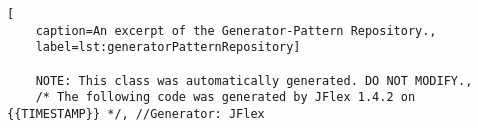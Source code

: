 
\begin{lstlisting}[
	caption=An excerpt of the Generator-Pattern Repository.,
	label=lst:generatorPatternRepository]
	
	NOTE: This class was automatically generated. DO NOT MODIFY.,
	/* The following code was generated by JFlex 1.4.2 on {{TIMESTAMP}} */, //Generator: JFlex
	
	
	
\end{lstlisting}